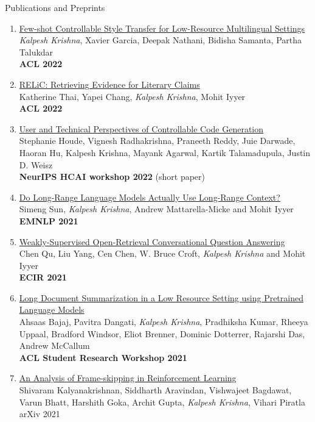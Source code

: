 \documentclass{resume} %
\begin{document}
\begin{rSection}{Publications and Preprints}
\begin{enumerate}[leftmargin=*]
\item \href{https://arxiv.org/abs/2110.07385}{Few-shot Controllable Style Transfer for Low-Resource Multilingual Settings} \\
\textit{Kalpesh Krishna}, Xavier Garcia, Deepak Nathani, Bidisha Samanta, Partha Talukdar \\
\textbf{ACL 2022}

\item \href{https://arxiv.org/abs/2203.10053}{RELiC: Retrieving Evidence for Literary Claims} \\
Katherine Thai, Yapei Chang, \textit{Kalpesh Krishna}, Mohit Iyyer \\
\textbf{ACL 2022}

\item \href{https://research.ibm.com/publications/user-and-technical-perspectives-of-controllable-code-generation}{User and Technical Perspectives of Controllable Code Generation} \\
Stephanie Houde, Vignesh Radhakrishna, Praneeth Reddy, Juie Darwade, Haoran Hu, Kalpesh Krishna, Mayank Agarwal, Kartik Talamadupula, Justin D. Weisz \\
\textbf{NeurIPS HCAI workshop 2022} (short paper)

\item \href{https://arxiv.org/abs/2109.09115}{Do Long-Range Language Models Actually Use Long-Range Context?} \\
Simeng Sun, \textit{Kalpesh Krishna}, Andrew Mattarella-Micke and Mohit Iyyer \\
\textbf{EMNLP 2021}

\item \href{https://arxiv.org/abs/2103.02537}{Weakly-Supervised Open-Retrieval Conversational Question Answering} \\
Chen Qu, Liu Yang, Cen Chen, W. Bruce Croft, \textit{Kalpesh Krishna} and Mohit Iyyer \\
\textbf{ECIR 2021}
\item \href{https://arxiv.org/abs/2103.00751}{Long Document Summarization in a Low Resource Setting using Pretrained Language Models} \\ Ahsaas Bajaj, Pavitra Dangati, \textit{Kalpesh Krishna}, Pradhiksha Kumar, Rheeya Uppaal, Bradford Windsor, Eliot Brenner, Dominic Dotterrer, Rajarshi Das, Andrew McCallum \\
\textbf{ACL Student Research Workshop 2021}
\item \href{https://arxiv.org/abs/2102.03718}{An Analysis of Frame-skipping in Reinforcement Learning} \\ Shivaram Kalyanakrishnan, Siddharth Aravindan, Vishwajeet Bagdawat, Varun Bhatt, Harshith Goka, Archit Gupta, \textit{Kalpesh Krishna}, Vihari Piratla \\
arXiv 2021


\end{enumerate}
\end{rSection}
\end{document}
